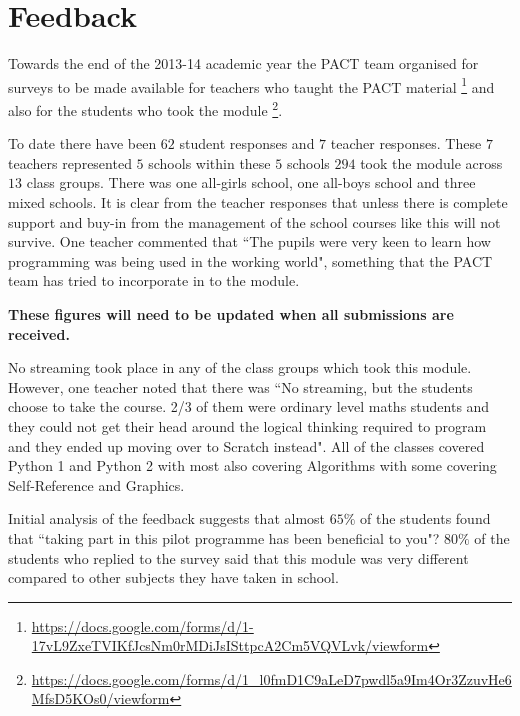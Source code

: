 \documentclass[a4paper]{article}
\begin{document}

\section{Feedback}
Towards the end of the 2013-14 academic year the PACT team organised for surveys to be made available for teachers who taught the PACT material \footnote{\url{https://docs.google.com/forms/d/1-17vL9ZxeTVIKfJcsNm0rMDiJsISttpcA2Cm5VQVLvk/viewform}} and also for the students who took the module \footnote{\url{https://docs.google.com/forms/d/1_l0fmD1C9aLeD7pwdl5a9Im4Or3ZzuvHe6MfsD5KOs0/viewform}}. 

To date there have been $62$ student responses and $7$ teacher responses.  These $7$ teachers represented $5$ schools within these $5$ schools $294$ took the module across $13$ class groups. There was one all-girls school, one all-boys school and three mixed schools. It is clear from the teacher responses that unless there is complete support and buy-in from the management of the school courses like this will not survive.  One teacher commented that ``The pupils were very keen to learn how programming was being used in the working world", something that the PACT team has tried to incorporate in to the module.

\textbf{These figures will need to be updated when all submissions are received.}

No streaming took place in any of the class groups which took this module. However, one teacher noted that there was ``No streaming, but the students choose to take the course. 2/3 of them were ordinary level maths students and they could not get their head around the logical thinking required to program and they ended up moving over to Scratch instead". All of the classes covered Python 1 and Python 2 with most also covering Algorithms with some covering Self-Reference and Graphics.

Initial analysis of the feedback suggests that almost $65\%$ of the students found that ``taking part in this pilot programme has been beneficial to you"? $80\%$ of the students who replied to the survey said that this module was very different compared to other subjects they have taken in school.
\end{document}
